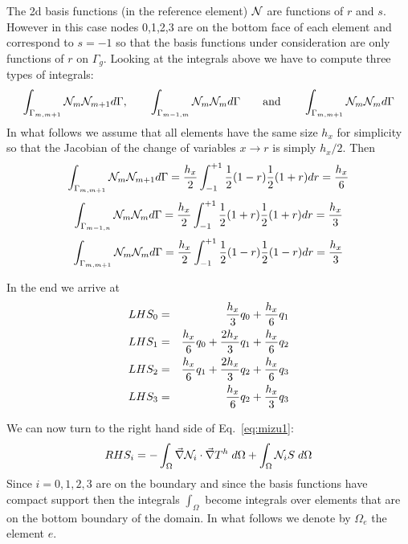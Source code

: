 The 2d basis functions (in the reference element) ${\mathcal{N}}$ are functions of $r$ and $s$.
However in this case nodes 0,1,2,3 are on the bottom face of each element and correspond
to $s=-1$ so that the basis functions under consideration are only functions of $r$ on $\Gamma_g$.
Looking at the integrals above we have to compute three types of integrals:
\[
\int_{\Gamma_{m,m+1}} {\mathcal{N}}_m{\mathcal{N}}_{m+1} d\Gamma,
\qquad
\int_{\Gamma_{m-1,m}} {\mathcal{N}}_m{\mathcal{N}}_m d\Gamma
\qquad
\text{and}
\qquad
\int_{\Gamma_{m,m+1}} {\mathcal{N}}_m{\mathcal{N}}_m d\Gamma
\]
In what follows we assume that all elements have the same size $h_x$ for simplicity so that 
the Jacobian of the change of variables $x \rightarrow r$ is simply $h_x/2$.
Then
\[
\int_{\Gamma_{m,m+1}} {\mathcal{N}}_m{\mathcal{N}}_{m+1} d\Gamma 
= \frac{h_x}{2} \int_{-1}^{+1} \frac12 (1-r) \frac12(1+r) dr 
= \frac{h_x}{6}
\]
\[
\int_{\Gamma_{m-1,n}} {\mathcal{N}}_m{\mathcal{N}}_m d\Gamma
= \frac{h_x}{2} \int_{-1}^{+1} \frac12 (1+r) \frac12(1+r) dr 
= \frac{h_x}{3}
\]
\[
\int_{\Gamma_{m,m+1}} {\mathcal{N}}_m{\mathcal{N}}_m d\Gamma
= \frac{h_x}{2} \int_{-1}^{+1} \frac12 (1-r) \frac12(1-r) dr 
= \frac{h_x}{3}
\]

In the end we arrive at
\begin{eqnarray}
LHS_0 &=&  \frac{h_x}{3} q_0 + \frac{h_x}{6} q_1 \nonumber\\  
LHS_1 &=&  \frac{h_x}{6} q_0 + \frac{2h_x}{3} q_1  + \frac{h_x}{6} q_2  \nonumber\\
LHS_2 &=&  \frac{h_x}{6} q_1 + \frac{2h_x}{3} q_2  + \frac{h_x}{6} q_3  \nonumber\\
LHS_3 &=&  \frac{h_x}{6} q_2  +\frac{h_x}{3} q_3  \nonumber
\end{eqnarray}




We can now turn to the right hand side of Eq.~\eqref{eq:mizu1}:
\[
RHS_i=
-\int_\Omega \vec\nabla {\mathcal{N}}_i \cdot \vec\nabla T^h \; d\Omega
+ \int_\Omega {\mathcal{N}}_i S \; d\Omega
\]
Since $i=0,1,2,3$ are on the boundary and since the basis functions 
have compact support then the integrals $\int_\Omega$ become integrals 
over elements that are on the bottom boundary of the domain. 
In what follows we denote by $\Omega_e$ the element $e$.

